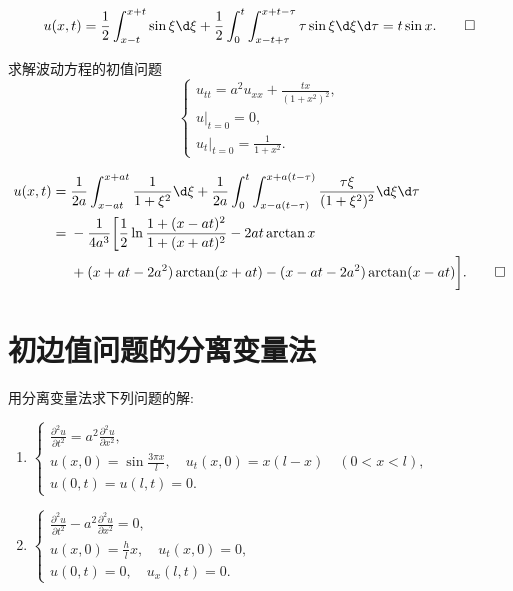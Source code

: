 \begin{solve}
  \[u(x,t) = \frac{1}{2}\int_{x-t}^{x+t}\sin \xi\d\xi
      + \frac{1}{2}\int_0^t\int_{x-t+\tau}^{x+t-\tau}\tau\sin \xi\d\xi\d\tau 
      = t\sin x.\qedhere\]
\end{solve}


\begin{exercise}[9]
  求解波动方程的初值问题
  \[\begin{cases}
    u_{tt} = a^2u_{xx} + \frac{tx}{(1+x^2)^2}, \\
    u|_{t=0} = 0, \\
    u_t|_{t=0} = \frac{1}{1+x^2}.
  \end{cases}\]  
\end{exercise}


\begin{solve}
  \begin{align*}
    u(x,t)
    ={} & \frac{1}{2a}\int_{x-at}^{x+at}\frac{1}{1+\xi^2}\d\xi
      + \frac{1}{2a}\int_0^t\int_{x-a(t-\tau)}^{x+a(t-\tau)}
      \frac{\tau\xi}{(1+\xi^2)^2}\d\xi\d\tau \\
    ={} & -\frac{1}{4a^3}\bigg[\frac{1}{2}\ln\frac{1+(x-at)^2}{1+(x+at)^2}
          - 2at\arctan x \\
        & + (x+at-2a^2)\arctan (x+at) - (x-at-2a^2)\arctan (x-at)\bigg].\qedhere
  \end{align*}
\end{solve}


\section{初边值问题的分离变量法}

\begin{exercise}
  用分离变量法求下列问题的解:
  \begin{enumerate}[(1)]
    \item $\begin{cases}
      \frac{\partial^2u}{\partial t^2} = a^2 \frac{\partial^2u}{\partial x^2}, \\
      u(x,0) = \sin\frac{3\pi x}{l},\quad u_t(x,0) = x(l-x)\quad (0<x<l), \\
      u(0,t) = u(l,t) = 0.
    \end{cases}$
    \item $\begin{cases}
      \frac{\partial^2u}{\partial t^2} - a^2 \frac{\partial^2u}{\partial x^2} = 0, \\
      u(x,0) = \frac{h}{l}x, \quad u_t(x,0) = 0, \\
      u(0,t) = 0,\quad u_x(l,t) = 0.  
    \end{cases}$
  \end{enumerate}
\end{exercise}

